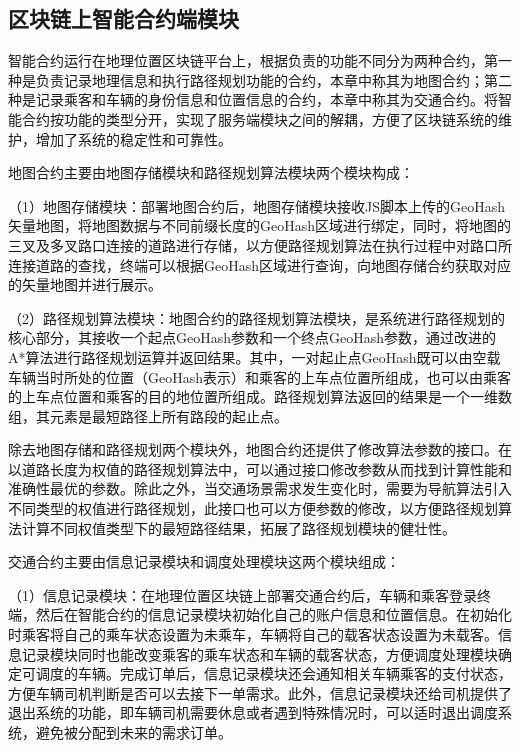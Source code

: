 \subsection{区块链上智能合约端模块}
智能合约运行在地理位置区块链平台上，根据负责的功能不同分为两种合约，第一种是负责记录地理信息和执行路径规划功能的合约，本章中称其为地图合约；第二种是记录乘客和车辆的身份信息和位置信息的合约，本章中称其为交通合约。将智能合约按功能的类型分开，实现了服务端模块之间的解耦，方便了区块链系统的维护，增加了系统的稳定性和可靠性。\par

地图合约主要由地图存储模块和路径规划算法模块两个模块构成：\par
（1）地图存储模块：部署地图合约后，地图存储模块接收JS脚本上传的GeoHash矢量地图，将地图数据与不同前缀长度的GeoHash区域进行绑定，同时，将地图的三叉及多叉路口连接的道路进行存储，以方便路径规划算法在执行过程中对路口所连接道路的查找，终端可以根据GeoHash区域进行查询，向地图存储合约获取对应的矢量地图并进行展示。\par

（2）路径规划算法模块：地图合约的路径规划算法模块，是系统进行路径规划的核心部分，其接收一个起点GeoHash参数和一个终点GeoHash参数，通过改进的A*算法进行路径规划运算并返回结果。其中，一对起止点GeoHash既可以由空载车辆当时所处的位置（GeoHash表示）和乘客的上车点位置所组成，也可以由乘客的上车点位置和乘客的目的地位置所组成。路径规划算法返回的结果是一个一维数组，其元素是最短路径上所有路段的起止点。\par

除去地图存储和路径规划两个模块外，地图合约还提供了修改算法参数的接口。在以道路长度为权值的路径规划算法中，可以通过接口修改参数从而找到计算性能和准确性最优的参数。除此之外，当交通场景需求发生变化时，需要为导航算法引入不同类型的权值进行路径规划，此接口也可以方便参数的修改，以方便路径规划算法计算不同权值类型下的最短路径结果，拓展了路径规划模块的健壮性。\par

交通合约主要由信息记录模块和调度处理模块这两个模块组成：\par

（1）信息记录模块：在地理位置区块链上部署交通合约后，车辆和乘客登录终端，然后在智能合约的信息记录模块初始化自己的账户信息和位置信息。在初始化时乘客将自己的乘车状态设置为未乘车，车辆将自己的载客状态设置为未载客。信息记录模块同时也能改变乘客的乘车状态和车辆的载客状态，方便调度处理模块确定可调度的车辆。完成订单后，信息记录模块还会通知相关车辆乘客的支付状态，方便车辆司机判断是否可以去接下一单需求。此外，信息记录模块还给司机提供了退出系统的功能，即车辆司机需要休息或者遇到特殊情况时，可以适时退出调度系统，避免被分配到未来的需求订单。\par

